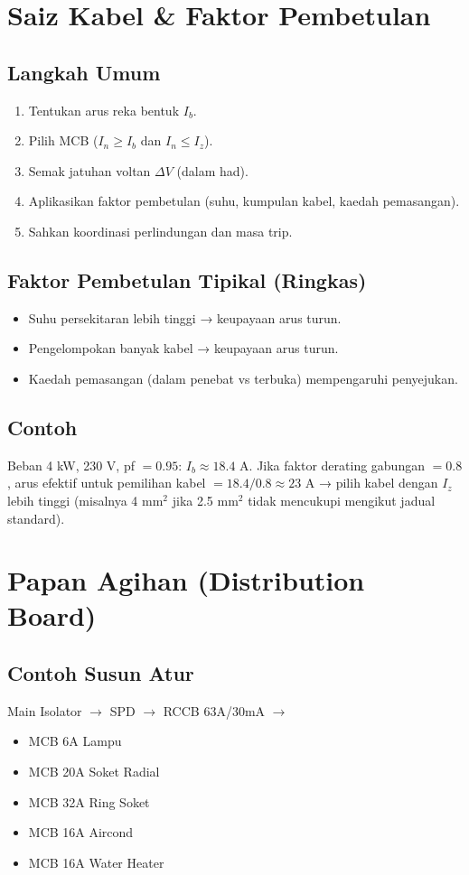 \documentclass[12pt,a4paper,oneside]{scrreprt}
\begin{document}
\chapter{Saiz Kabel \& Faktor Pembetulan}
\section{Langkah Umum}
\begin{enumerate}
  \item Tentukan arus reka bentuk $I_b$.
  \item Pilih MCB ($I_n \ge I_b$ dan $I_n \le I_z$).
  \item Semak jatuhan voltan $\Delta V$ (dalam had).
  \item Aplikasikan faktor pembetulan (suhu, kumpulan kabel, kaedah pemasangan).
  \item Sahkan koordinasi perlindungan dan masa trip.
\end{enumerate}

\section{Faktor Pembetulan Tipikal (Ringkas)}
\begin{itemize}
  \item Suhu persekitaran lebih tinggi → keupayaan arus turun.
  \item Pengelompokan banyak kabel → keupayaan arus turun.
  \item Kaedah pemasangan (dalam penebat vs terbuka) mempengaruhi penyejukan.
\end{itemize}

\section{Contoh}
Beban 4 kW, 230 V, pf $=0.95$: $I_b \approx 18.4$ A. Jika faktor derating gabungan $=0.8$, arus efektif untuk pemilihan kabel $= 18.4 / 0.8 \approx 23$ A → pilih kabel dengan $I_z$ lebih tinggi (misalnya 4 mm$^2$ jika 2.5 mm$^2$ tidak mencukupi mengikut jadual standard).

\chapter{Papan Agihan (Distribution Board)}
\section{Contoh Susun Atur}
\begin{tcolorbox}
Main Isolator $\rightarrow$ SPD $\rightarrow$ RCCB 63A/30mA $\rightarrow$
\begin{itemize}
  \item MCB 6A Lampu
  \item MCB 20A Soket Radial
  \item MCB 32A Ring Soket
  \item MCB 16A Aircond
  \item MCB 16A Water Heater
\end{itemize}
\end{tcolorbox}
\end{document}
